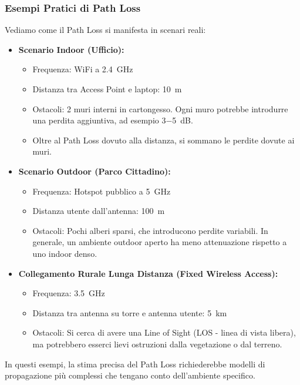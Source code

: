 \subsubsection{Esempi Pratici di Path Loss}
Vediamo come il Path Loss si manifesta in scenari reali:
\begin{itemize}
    \item \textbf{Scenario Indoor (Ufficio):}
    \begin{itemize}
        \item Frequenza: WiFi a \SI{2.4}{\giga\hertz}
        \item Distanza tra Access Point e laptop: \SI{10}{\meter}
        \item Ostacoli: 2 muri interni in cartongesso. Ogni muro potrebbe introdurre una perdita aggiuntiva, ad esempio \SI{3-5}{dB}.
        \item Oltre al Path Loss dovuto alla distanza, si sommano le perdite dovute ai muri.
    \end{itemize}
    
    \item \textbf{Scenario Outdoor (Parco Cittadino):}
    \begin{itemize}
        \item Frequenza: Hotspot pubblico a \SI{5}{\giga\hertz}
        \item Distanza utente dall'antenna: \SI{100}{\meter}
        \item Ostacoli: Pochi alberi sparsi, che introducono perdite variabili. In generale, un ambiente outdoor aperto ha meno attenuazione rispetto a uno indoor denso.
    \end{itemize}
    
    \item \textbf{Collegamento Rurale Lunga Distanza (Fixed Wireless Access):}
    \begin{itemize}
        \item Frequenza: \SI{3.5}{\giga\hertz}
        \item Distanza tra antenna su torre e antenna utente: \SI{5}{\kilo\meter}
        \item Ostacoli: Si cerca di avere una Line of Sight (LOS - linea di vista libera), ma potrebbero esserci lievi ostruzioni dalla vegetazione o dal terreno.
    \end{itemize}
\end{itemize}
In questi esempi, la stima precisa del Path Loss richiederebbe modelli di propagazione più complessi che tengano conto dell'ambiente specifico.

